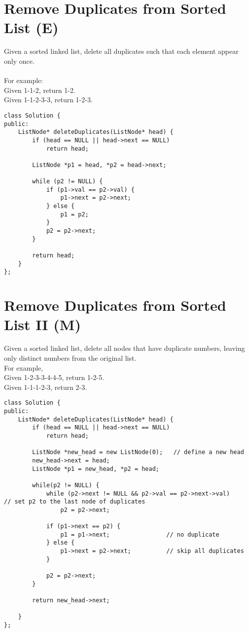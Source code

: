 \section{Remove Duplicates from Sorted List (E)}

Given a sorted linked list, delete all duplicates such that each element appear only once.\\ \\
For example: \\
Given 1-1-2, return 1-2. \\
Given 1-1-2-3-3, return 1-2-3. \\

\begin{lstlisting}
class Solution {
public:
    ListNode* deleteDuplicates(ListNode* head) {
        if (head == NULL || head->next == NULL)
            return head;
        
        ListNode *p1 = head, *p2 = head->next;
        
        while (p2 != NULL) {
            if (p1->val == p2->val) {
                p1->next = p2->next; 
            } else {
                p1 = p2;
            }
            p2 = p2->next;
        }
        
        return head;
    }
};
\end{lstlisting}


\section{Remove Duplicates from Sorted List II (M)}
Given a sorted linked list, delete all nodes that have duplicate numbers, leaving only distinct numbers from the original list.\\

For example,\\
Given 1-2-3-3-4-4-5, return 1-2-5.\\
Given 1-1-1-2-3, return 2-3. \\

\begin{lstlisting}
class Solution {
public:
    ListNode* deleteDuplicates(ListNode* head) {
        if (head == NULL || head->next == NULL)
            return head;
        
        ListNode *new_head = new ListNode(0);   // define a new head
        new_head->next = head;
        ListNode *p1 = new_head, *p2 = head;
        
        while(p2 != NULL) {
            while (p2->next != NULL && p2->val == p2->next->val)		// set p2 to the last node of duplicates
                p2 = p2->next;
            
            if (p1->next == p2) {
                p1 = p1->next;                // no duplicate
            } else {
                p1->next = p2->next;          // skip all duplicates
            }
            
            p2 = p2->next;
        }
        
        return new_head->next;
        
    }
};
\end{lstlisting}


